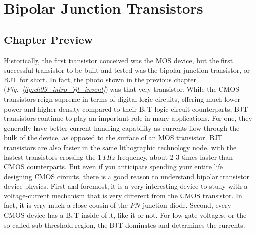 \chapter{Bipolar Junction Transistors}
\label{ch:ch11_bjt}
\graphicspath{{./figures/figs_ch11_bjt/}}
\section{Chapter Preview}
Historically, the first transistor conceived was the MOS device, but the first successful transistor to be built and tested was the bipolar junction transistor, or BJT for short.  In fact, the photo shown in the previous chapter (\emph{Fig.~\ref{fig:ch09_intro_bjt_invent}}) was that very transistor.  While the CMOS transistors reign supreme in terms of digital logic circuits, offering much lower power and higher density compared to their BJT logic circuit counterparts, BJT transistors continue to play an important role in many applications.  For one, they generally have better current handling capability as currents flow through the bulk of the device, as opposed to the surface of an MOS transistor.  BJT transistors are also faster in the same lithographic technology node, with the fastest transistors crossing the $1\,THz$ frequency, about 2-3 times faster than CMOS counterparts.  But even if you anticipate spending your entire life designing CMOS circuits, there is a good reason to understand bipolar transistor device physics.  First and foremost, it is a very interesting device to study with a voltage-current mechanism that is very different from the CMOS transistor.  In fact, it is very much a close cousin of the $PN$-junction diode.  Second, every CMOS device has a BJT inside of it, like it or not.  For low gate voltages, or the so-called sub-threshold region, the BJT dominates and determines the currents.  

